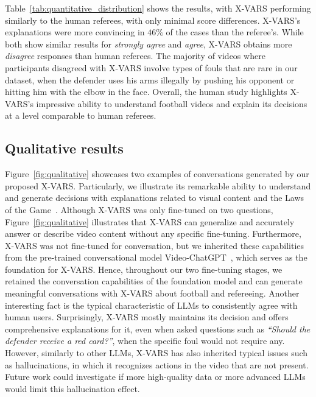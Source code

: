 Table~\ref{tab:quantitative_distribution} shows the results, with X-VARS performing similarly to the human referees, with only minimal score differences. 
X-VARS's explanations were more convincing in $46\%$ of the cases than the referee's. 
While both show similar results for \textit{strongly agree} and \textit{agree}, X-VARS obtains more \textit{disagree} responses than human referees. 
The majority of videos where participants disagreed with X-VARS involve types of fouls that are rare in our dataset, \ie when the defender uses his arms illegally by pushing his opponent or hitting him with the elbow in the face.
Overall, the human study highlights X-VARS's impressive ability to understand football videos and explain its decisions at a level comparable to human referees.

\subsection{Qualitative results}

Figure~\ref{fig:qualitative} showcases two examples of conversations generated by our proposed X-VARS. Particularly, we illustrate its remarkable ability to understand and generate decisions with explanations related to visual content and the Laws of the Game~\cite{IFAB2022Laws}. 
Although X-VARS was only fine-tuned on two questions, Figure~\ref{fig:qualitative} illustrates that X-VARS can generalize and accurately answer or describe video content without any specific fine-tuning. 
Furthermore, X-VARS was not fine-tuned for conversation, but we inherited these capabilities from the pre-trained conversational model Video-ChatGPT~\cite{Maaz2023VideoChatGPT-arxiv}, which serves as the foundation for X-VARS. 
Hence, throughout our two fine-tuning stages, we retained the conversation capabilities of the foundation model and can generate meaningful conversations with X-VARS about football and refereeing.
Another interesting fact is the typical characteristic of LLMs to consistently agree with human users. 
Surprisingly, X-VARS mostly maintains its decision and offers comprehensive explanations for it, even when asked questions such as \textit{``Should the defender receive a red card?''}, when the specific foul would not require any.
However, similarly to other LLMs, X-VARS has also inherited typical issues such as hallucinations, in which it recognizes actions in the video that are not present. 
Future work could investigate if more high-quality data or more advanced LLMs would limit this hallucination effect.

